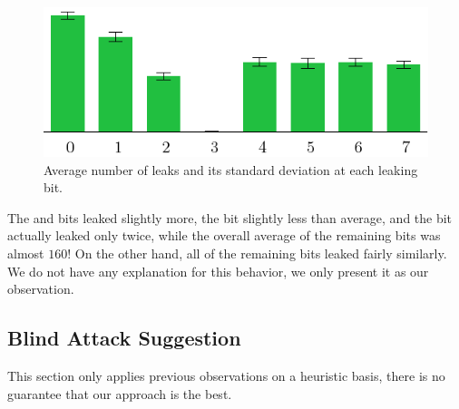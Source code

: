 	\begin{figure}[h]
	\begin{center}
		\includegraphics{figures/leak_bit/leak_bit.pdf}
		\caption{Average number of leaks and its standard deviation at each leaking bit.}
		\label{fig:leakbitall}
	\end{center}
	\end{figure}
	
	The  and  bits leaked slightly more, the  bit slightly less than average, and the  bit actually leaked only twice, while the overall average of the remaining bits was almost $160$! On the other hand, all of the remaining bits leaked fairly similarly. We do not have any explanation for this behavior, we only present it as our observation.



\subsection{Blind Attack Suggestion}
\label{sec:subblindattack}

\begin{note}
	This section only applies previous observations on a heuristic basis, there is no guarantee that our approach is the best.
\end{note}


